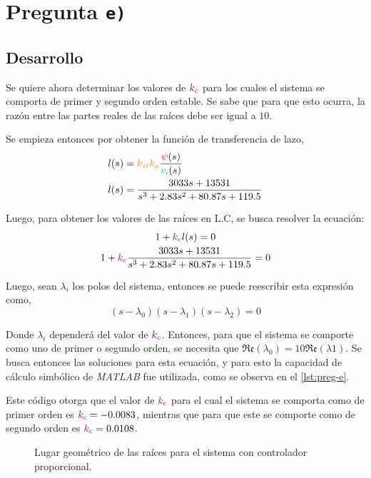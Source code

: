 \section{Pregunta \texttt{e)}}\label{pregunta-e}
\subsection{Desarrollo}

Se quiere ahora determinar los valores de $\mathbin{\color{violet}k_{c}}$ para los cuales el
sistema se comporta de primer y segundo orden estable. Se sabe que para que
esto ocurra, la razón entre las partes reales de las raíces debe ser igual a
$10$.

Se empieza entonces por obtener la función de transferencia de lazo,
\begin{align}
    l(s) &= \nara{k_{st}k_{a}} \frac{\rojo{\psi}(s)}{\verd{v_{i}}(s)} \\
    l(s) &= \frac{3033s + 13531}{s^{3} + 2.83s^{2} + 80.87s + 119.5}
\end{align}

Luego, para obtener los valores de las raíces en L.C, se busca resolver la
ecuación:
\begin{gather}
    1 + \mathbin{\color{violet}k_{c}}l(s) = 0 \\
    1 + \mathbin{\color{violet}k_{c}}\frac{3033s + 13531}{s^{3} + 2.83s^{2} + 80.87s + 119.5} = 0
\end{gather}

Luego, sean $\lambda_{i}$ los polos del sistema, entonces se puede reescribir
esta expresión como,
\begin{equation}
    (s - \lambda_{0})(s - \lambda_{1})(s - \lambda_{2}) = 0
\end{equation}

Donde $\lambda_{i}$ dependerá del valor de $\mathbin{\color{violet}k_{c}}$. Entonces, para que
el sistema se comporte como uno de primer o segundo orden, se necesita que
$\mathfrak{Re}(\lambda_{0}) = 10\mathfrak{Re}(\lambda{1})$. Se busca entonces
las soluciones para esta ecuación, y para esto la capacidad de cálculo simbólico
de \textit{MATLAB} fue utilizada, como se observa en el \autoref{lst:preg-e}.

Este código otorga que el valor de $\mathbin{\color{violet}k_{c}}$ para el cual el sistema se
comporta como de primer orden es $\mathbin{\color{violet}k_{c}} = -0.0083$, mientras que para
que este se comporte como de segundo orden es $\mathbin{\color{violet}k_{c}} = 0.0108$.

\begin{figure}[ht]
  \centering
  
  \caption{Lugar geométrico de las raíces para el sistema con controlador proporcional.}
  \label{fig:lgr-e}
\end{figure}

